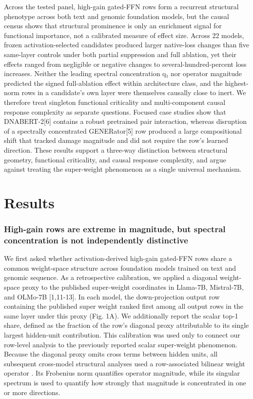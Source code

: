 \documentclass[11pt]{article}
\begin{document}
Across the tested panel, high-gain gated-FFN rows form a recurrent structural phenotype across both text and genomic foundation models, but the causal census shows that structural prominence is only an enrichment signal for functional importance, not a calibrated measure of effect size. Across 22 models, frozen activation-selected candidates produced larger native-loss changes than five same-layer controls under both partial suppression and full ablation, yet their effects ranged from negligible or negative changes to several-hundred-percent loss increases. Neither the leading spectral concentration q₁ nor operator magnitude predicted the signed full-ablation effect within architecture class, and the highest-norm rows in a candidate’s own layer were themselves causally close to inert. We therefore treat singleton functional criticality and multi-component causal response complexity as separate questions. Focused case studies show that DNABERT-2[6] contains a robust pretrained pair interaction, whereas disruption of a spectrally concentrated GENERator[5] row produced a large compositional shift that tracked damage magnitude and did not require the row’s learned direction. These results support a three-way distinction between structural geometry, functional criticality, and causal response complexity, and argue against treating the super-weight phenomenon as a single universal mechanism.

\section*{Results}
\subsubsection*{High-gain rows are extreme in magnitude, but spectral concentration is not independently distinctive}
We first asked whether activation-derived high-gain gated-FFN rows share a common weight-space structure across foundation models trained on text and genomic sequence. As a retrospective calibration, we applied a diagonal weight-space proxy to the published super-weight coordinates in Llama-7B, Mistral-7B, and OLMo-7B [1,11-13]. In each model, the down-projection output row containing the published super weight ranked first among all output rows in the same layer under this proxy (Fig. 1A). We additionally report the scalar top-1 share, defined as the fraction of the row’s diagonal proxy attributable to its single largest hidden-unit contribution. This calibration was used only to connect our row-level analysis to the previously reported scalar super-weight phenomenon. Because the diagonal proxy omits cross terms between hidden units, all subsequent cross-model structural analyses used a row-associated bilinear weight operator . Its Frobenius norm quantifies operator magnitude, while its singular spectrum is used to quantify how strongly that magnitude is concentrated in one or more directions.
\end{document}
